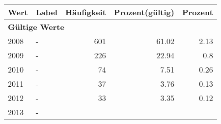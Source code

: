      \begin{longtable}{lXrrr}
     \toprule
     \textbf{Wert} & \textbf{Label} & \textbf{Häufigkeit} & \textbf{Prozent(gültig)} & \textbf{Prozent} \\
     \endhead
     \midrule
     \multicolumn{5}{l}{\textbf{Gültige Werte}}\\

     2008 &
     \multicolumn{1}{X}{ -  } &


       \num{601} &
       \num[round-mode=places,round-precision=2]{61.02} &
         \num[round-mode=places,round-precision=2]{2.13} \\

     2009 &
     \multicolumn{1}{X}{ -  } &


       \num{226} &
       \num[round-mode=places,round-precision=2]{22.94} &
         \num[round-mode=places,round-precision=2]{0.8} \\

     2010 &
     \multicolumn{1}{X}{ -  } &


       \num{74} &
       \num[round-mode=places,round-precision=2]{7.51} &
         \num[round-mode=places,round-precision=2]{0.26} \\

     2011 &
     \multicolumn{1}{X}{ -  } &


       \num{37} &
       \num[round-mode=places,round-precision=2]{3.76} &
         \num[round-mode=places,round-precision=2]{0.13} \\

     2012 &
     \multicolumn{1}{X}{ -  } &


       \num{33} &
       \num[round-mode=places,round-precision=2]{3.35} &
         \num[round-mode=places,round-precision=2]{0.12} \\

     2013 &
     \multicolumn{1}{X}{ -  } &



\end{longtable}
